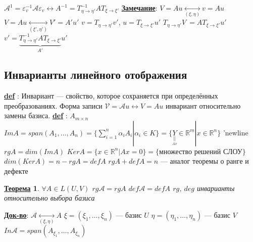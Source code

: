 \documentclass[12pt,a4paper]{article}
\newcommand{\bfline}[1]{\textbf{\underline{#1}}}
\newcommand{\Def}{\bfline{def} }
\newcommand{\R}{\mathbb{R}}
\newtheorem*{theorem*}{\bfline{Теорема}}
\begin{document}
$\mathcal{A}^1 = \varepsilon_{v}^{-1} \mathcal{A} \varepsilon_{v} \leftrightarrow A^{-1} = T_{\eta \rightarrow \eta'}^{-1} A T_{\xi \rightarrow \xi'}$ \newline
\bfline{Замечание}:
$V = Au \underset{(\xi, \eta)}{\leftrightarrow} v = Au$ \newline
$V = Au \underset{(\xi', \eta')}{\leftrightarrow} V' = A' u'$ \newline
$v = T_{\eta \rightarrow \eta'} v'$, $u = T_{\xi \rightarrow \xi'} u'$ \newline
$T_{\eta \rightarrow \eta'} V\ = A T_{\xi \rightarrow \xi'} u'$ \newline
$v' = \underset{A'}{\underbrace{T^{-1}_{\eta \rightarrow \eta'} A T_{\xi \rightarrow \xi'}}} u'$
\subsection{Инварианты линейного отображения}
\Def : Инвариант --- свойство, которое сохраняется при определённых преобразованиях. \newline
Форма записи $\mathcal{V} = \mathcal{A}u \leftrightarrow V = Au$ инвариант относительно замены базиса. \newline
\Def : $A_{m \times n}$ \newline
$Im A = span(A_1, \ldots, A_n) = \{ \sum\limits_{i=1}^{n} \alpha_i A_i | \alpha_i \in K\} =\{ \underset{\underset{Ax}{||}}{Y} \in \R^m | x \in \R^n\}$ 'newline
$rg A = dim(Im A)$ \newline
$Ker A = \{ x \in \R^n | Ax = 0\} = \{ \text{множество решений СЛОУ}\}$ \newline
$dim(Ker A) = n - rg A = def A$ \newline
$rg A + def A = n$ --- аналог теоремы о ранге и дефекте \newline
\begin{theorem*}
$\forall A \in L(U, V)$ \newline
$rg \mathcal{A} = rg A$ \newline
$def \mathcal{A} = def A$ \newline
$rg$, $deg$ инварианты относительно выбора базиса
\end{theorem*}
\bfline{Док-во}: $\mathcal{A} \underset{(\xi, \eta)}{\leftrightarrow} A$ \newline
$\xi = (\xi_1, \ldots, \xi_n)$ --- базис $U$ \newline
$\eta = (\eta_1, \ldots, \eta_n)$ --- базис $V$ \newline
$In \mathcal{A} = span(A_{\xi_1}, \ldots, A_{\xi_n})$ \newline
\end{document}
